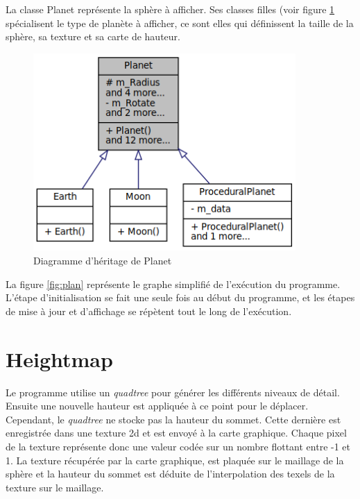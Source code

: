  La classe Planet représente la sphère à afficher. Ses classes filles
  (voir figure \ref{fig:inh_planet} spécialisent le type de planète
  à afficher, ce sont elles qui définissent la taille de la sphère,
  sa texture et sa carte de hauteur.\\
  
  \begin{figure}
  \centering
  \includegraphics[width=10cm]{img/planet_inh.png}
  \caption{Diagramme d'héritage de Planet}
  \label{fig:inh_planet}
  \end{figure}
  
 
  La figure \ref{fig:plan} représente le graphe simplifié de
  l'exécution du programme. L'étape d'initialisation se fait une seule
  fois au début du programme, et les étapes de mise à jour et d'affichage
  se répètent tout le long de l'exécution.
  
\section{Heightmap}
  
  Le programme utilise un \emph{quadtree} pour générer les différents niveaux de détail. 
  Ensuite une nouvelle hauteur est appliquée à ce point pour le déplacer. 
  Cependant, le \emph{quadtree} ne stocke pas la hauteur du sommet. Cette dernière
  est enregistrée dans une texture 2d et est envoyé à la carte graphique. 
  Chaque pixel de la texture représente donc une valeur codée sur un nombre flottant entre -1 et 1.
  La texture récupérée par la carte graphique, est plaquée sur le maillage de la sphère et la hauteur du sommet
  est déduite de l'interpolation des texels de la texture sur le maillage.
  

